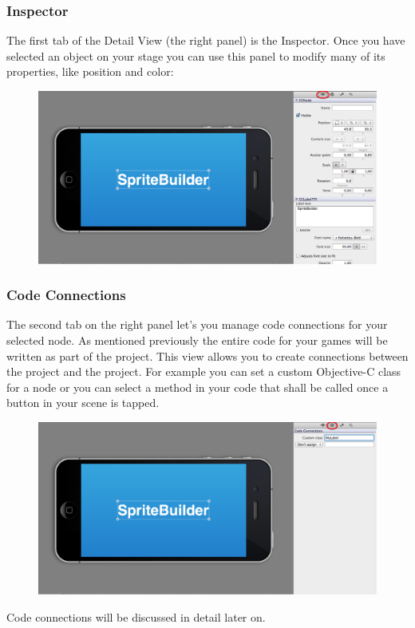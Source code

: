 \subsubsection{Inspector}
The first tab of the Detail View (the right panel) is
the Inspector. Once you have selected an object on your stage you can use this panel to modify many of its properties, like position and color:
\begin{figure}[H]
		\centering
		\includegraphics[width=0.8\linewidth]{images/spritebuilder/spritebuilder_inspector.png}     
\end{figure} 

\subsubsection{Code Connections} 
The second tab on the right panel let's you manage code connections for your
selected node. As mentioned previously the entire code for your games will be
written as part of the \xcode{} project. This view allows you to create
connections between the \xcode{} project and the \SB{} project. For example you can set a custom Objective-C class for a node or you can select
a method in your code that shall be called once a button in your scene is tapped. 

\begin{figure}[H]
		\centering
		\includegraphics[width=0.8\linewidth]{images/spritebuilder/spritebuilder_codeconnections.png}     
\end{figure} 
Code connections will be discussed in detail later on.

